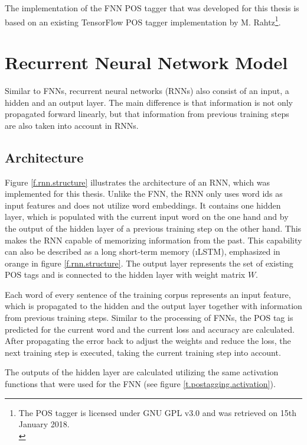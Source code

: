 The implementation of the FNN POS tagger that was developed for this thesis is based on an existing TensorFlow POS tagger implementation by M. Rahtz\footnote{The POS tagger is licensed under GNU GPL v3.0 and was retrieved on 15th January 2018.\\}.

\section{Recurrent Neural Network Model}\label{c.postagging.rnn}
Similar to FNNs, recurrent neural networks (RNNs) also consist of an input, a hidden and an output layer. The main difference is that information is not only propagated forward linearly, but that information from previous training steps are also taken into account in RNNs.

\subsection{Architecture}\label{c.postagging.rnn.architecture}
Figure \ref{f.rnn.structure} illustrates the architecture of an RNN, which was implemented for this thesis. Unlike the FNN, the RNN only uses word ids as input features and does not utilize word embeddings. It contains one hidden layer, which is populated with the current input word on the one hand and by the output of the hidden layer of a previous training step on the other hand. This makes the RNN capable of memorizing information from the past. This capability can also be described as a long short-term memory (\i{LSTM}), emphasized in orange in figure \ref{f.rnn.structure}. The output layer represents the set of existing POS tags and is connected to the hidden layer with weight matrix
$W$.

Each word of every sentence of the training corpus represents an input feature, which is propagated to the hidden and the output layer together with information from previous training steps. Similar to the processing of FNNs, the POS tag is predicted for the current word and the current loss and accuracy are calculated. After propagating the error back to adjust the weights and reduce the loss, the next training step is executed, taking the current training step into account.

The outputs of the hidden layer are calculated utilizing the same activation functions that were used for the FNN (see figure \ref{t.postagging.activation}).

